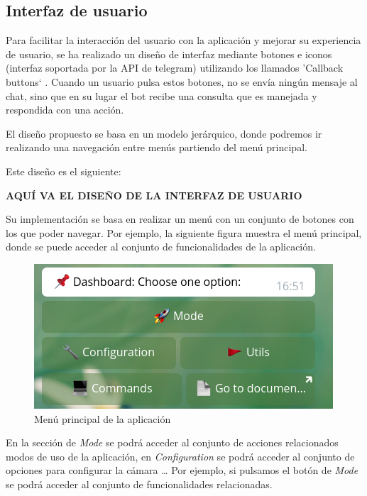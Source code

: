 


\pagestyle{miEstilo505}

\subsection{Interfaz de usuario}

Para facilitar la interacción del usuario con la aplicación y mejorar su experiencia de usuario, se ha realizado un diseño de interfaz mediante botones e iconos (interfaz soportada por la API de telegram) utilizando los llamados 'Callback buttons` \cite{refx1}. Cuando un usuario pulsa estos botones, no se envía ningún mensaje al chat, sino que en su lugar el bot recibe una consulta que es manejada y respondida con una acción.

El diseño propuesto se basa en un modelo jerárquico, donde podremos ir realizando una navegación entre menús partiendo del menú principal.

Este diseño es el siguiente:

\textbf{AQUÍ VA EL DISEÑO DE LA INTERFAZ DE USUARIO} 

\newpage

Su implementación se basa en realizar un menú con un conjunto de botones con los que poder navegar. Por ejemplo, la siguiente figura muestra el menú principal, donde se puede acceder al conjunto de funcionalidades de la aplicación.

\begin{figure}[h]
	\centering
	\includegraphics[scale=0.8]{images/42}
	\caption{Menú principal de la aplicación}
\end{figure}

En la sección de \textit{Mode} se podrá acceder al conjunto de acciones relacionados modos de uso de la aplicación, en \textit{Configuration} se podrá acceder al conjunto de opciones para configurar la cámara \ldots
Por ejemplo, si pulsamos el botón de \textit{Mode} se podrá acceder al conjunto de funcionalidades relacionadas.


